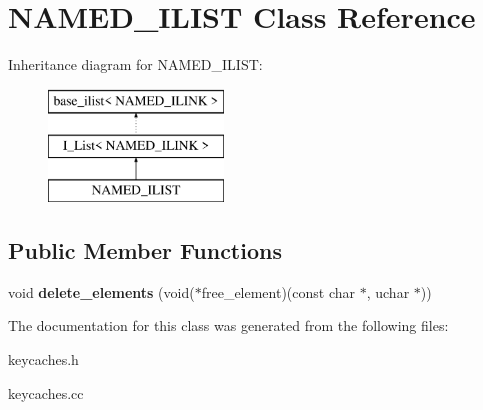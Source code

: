 \hypertarget{classNAMED__ILIST}{}\section{N\+A\+M\+E\+D\+\_\+\+I\+L\+I\+ST Class Reference}
\label{classNAMED__ILIST}
Inheritance diagram for N\+A\+M\+E\+D\+\_\+\+I\+L\+I\+ST\+:\begin{figure}[H]
\begin{center}
\leavevmode
\includegraphics[height=3.000000cm]{classNAMED__ILIST}
\end{center}
\end{figure}
\subsection*{Public Member Functions}
\begin{DoxyCompactItemize}
\item 
\mbox{\label{classNAMED__ILIST_ae5bc4576c36e9367b4fbe55ab2add072}} 
void {\bfseries delete\+\_\+elements} (void($\ast$free\+\_\+element)(const char $\ast$, uchar $\ast$))
\end{DoxyCompactItemize}


The documentation for this class was generated from the following files\+:\begin{DoxyCompactItemize}
\item 
keycaches.\+h\item 
keycaches.\+cc\end{DoxyCompactItemize}
